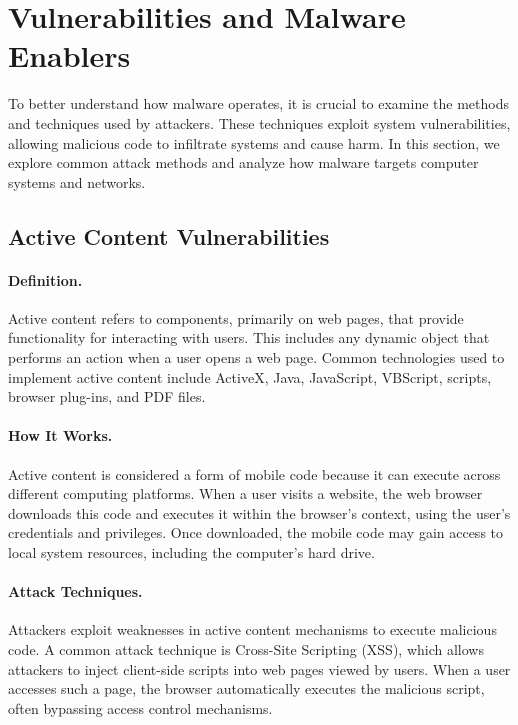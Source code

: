 \section{Vulnerabilities and Malware Enablers}

To better understand how malware operates, it is crucial to examine the methods and techniques used by attackers. These techniques exploit system vulnerabilities, allowing malicious code to infiltrate systems and cause harm. In this section, we explore common attack methods and analyze how malware targets computer systems and networks.

\subsection{Active Content Vulnerabilities}

\paragraph{Definition.}
Active content refers to components, primarily on web pages, that provide functionality for interacting with users. This includes any dynamic object that performs an action when a user opens a web page. Common technologies used to implement active content include ActiveX, Java, JavaScript, VBScript, scripts, browser plug-ins, and PDF files.

\paragraph{How It Works.}
Active content is considered a form of mobile code because it can execute across different computing platforms. When a user visits a website, the web browser downloads this code and executes it within the browser's context, using the user's credentials and privileges. Once downloaded, the mobile code may gain access to local system resources, including the computer's hard drive.

\paragraph{Attack Techniques.}
Attackers exploit weaknesses in active content mechanisms to execute malicious code. A common attack technique is Cross-Site Scripting (XSS), which allows attackers to inject client-side scripts into web pages viewed by users. When a user accesses such a page, the browser automatically executes the malicious script, often bypassing access control mechanisms.

